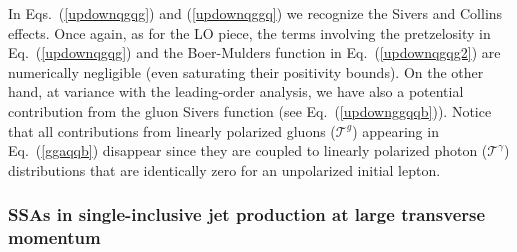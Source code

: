 \documentclass[nofootinbib,superscriptaddress,aps]{revtex4}
\begin{document}
{}In Eqs.~(\ref{updownqgqg}) and (\ref{updownqggq}) we recognize the Sivers and Collins effects. Once again, as for the LO piece, the terms involving the pretzelosity in Eq.~(\ref{updownqgqg}) and the Boer-Mulders function in Eq.~(\ref{updownqgqg2}) are numerically negligible (even saturating their positivity bounds). On the other hand, at variance with the leading-order analysis, we have also a potential contribution from the gluon Sivers function (see Eq.~(\ref{updownggqqb})). Notice that all contributions from linearly polarized gluons ($\mathcal{T}^g$) appearing in %
Eq.~(\ref{ggaqqb}) disappear since they are coupled to linearly polarized photon ($\mathcal{T}^\gamma$) distributions that are identically zero for an unpolarized initial lepton.


\subsubsection{SSAs in single-inclusive jet production at large transverse momentum}
\label{jet}
\end{document}
